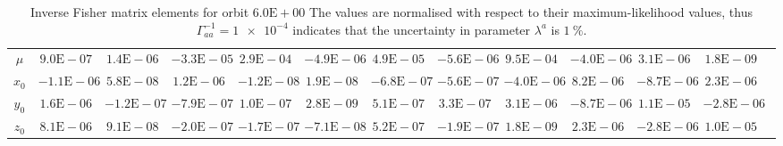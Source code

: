 \begin{sidewaystable}[htbp]
\begin{tabular}{cD{.}{.}{2.5}D{.}{.}{2.5}D{.}{.}{2.5}D{.}{.}{2.5}D{.}{.}{2.5}D{.}{.}{2.5}D{.}{.}{2.5}D{.}{.}{2.5}D{.}{.}{2.5}D{.}{.}{2.5}D{.}{.}{2.5}c}
$\mu$ & $9.0\mathrm{E}-07$ & $1.4\mathrm{E}-06$ & $-3.3\mathrm{E}-05$ & $2.9\mathrm{E}-04$ & $-4.9\mathrm{E}-06$ & $4.9\mathrm{E}-05$ & $-5.6\mathrm{E}-06$ & $9.5\mathrm{E}-04$ & $-4.0\mathrm{E}-06$ & $3.1\mathrm{E}-06$ & $1.8\mathrm{E}-09$ \\
$x_0$ & $-1.1\mathrm{E}-06$ & $5.8\mathrm{E}-08$ & $1.2\mathrm{E}-06$ & $-1.2\mathrm{E}-08$ & $1.9\mathrm{E}-08$ & $-6.8\mathrm{E}-07$ & $-5.6\mathrm{E}-07$ & $-4.0\mathrm{E}-06$ & $8.2\mathrm{E}-06$ & $-8.7\mathrm{E}-06$ & $2.3\mathrm{E}-06$ \\
$y_0$ & $1.6\mathrm{E}-06$ & $-1.2\mathrm{E}-07$ & $-7.9\mathrm{E}-07$ & $1.0\mathrm{E}-07$ & $2.8\mathrm{E}-09$ & $5.1\mathrm{E}-07$ & $3.3\mathrm{E}-07$ & $3.1\mathrm{E}-06$ & $-8.7\mathrm{E}-06$ & $1.1\mathrm{E}-05$ & $-2.8\mathrm{E}-06$ \\
$z_0$ & $8.1\mathrm{E}-06$ & $9.1\mathrm{E}-08$ & $-2.0\mathrm{E}-07$ & $-1.7\mathrm{E}-07$ & $-7.1\mathrm{E}-08$ & $5.2\mathrm{E}-07$ & $-1.9\mathrm{E}-07$ & $1.8\mathrm{E}-09$ & $2.3\mathrm{E}-06$ & $-2.8\mathrm{E}-06$ & $1.0\mathrm{E}-05$
\bottomrule
\end{tabular}
\caption{Inverse Fisher matrix elements for orbit $6.0\mathrm{E}+00$ The values are normalised with respect to their maximum-likelihood values, thus $\Gamma^{-1}_{aa} = \num{1e-4}$ indicates that the uncertainty in parameter $\lambda^a$ is $\SI{1}{\percent}$.}
\label{tab:Fisher_6}
\end{sidewaystable}
